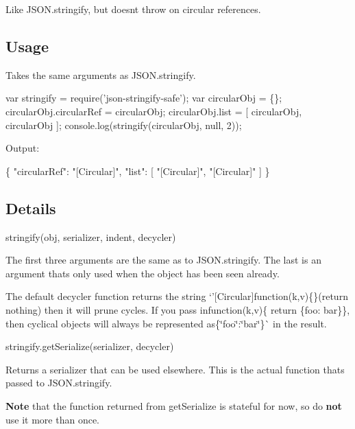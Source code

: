 Like J\+S\+O\+N.\+stringify, but doesn\textquotesingle{}t throw on circular references.

\subsection*{Usage}

Takes the same arguments as {\ttfamily J\+S\+O\+N.\+stringify}.


\begin{DoxyCode}
var stringify = require('json-stringify-safe');
var circularObj = \{\};
circularObj.circularRef = circularObj;
circularObj.list = [ circularObj, circularObj ];
console.log(stringify(circularObj, null, 2));
\end{DoxyCode}


Output\+:


\begin{DoxyCode}
\{
  "circularRef": "[Circular]",
  "list": [
    "[Circular]",
    "[Circular]"
  ]
\}
\end{DoxyCode}


\subsection*{Details}


\begin{DoxyCode}
stringify(obj, serializer, indent, decycler)
\end{DoxyCode}


The first three arguments are the same as to J\+S\+O\+N.\+stringify. The last is an argument that\textquotesingle{}s only used when the object has been seen already.

The default {\ttfamily decycler} function returns the string `'\mbox{[}Circular\mbox{]}function(k,v)\{\}{\ttfamily (return nothing) then it will prune cycles. If you pass in}function(k,v)\{ return \{foo\+: \textquotesingle{}bar\textquotesingle{}\}\}{\ttfamily , then cyclical objects will always be represented as}\{\char`\"{}foo\char`\"{}\+:\char`\"{}bar\char`\"{}\}\`{} in the result.


\begin{DoxyCode}
stringify.getSerialize(serializer, decycler)
\end{DoxyCode}


Returns a serializer that can be used elsewhere. This is the actual function that\textquotesingle{}s passed to J\+S\+O\+N.\+stringify.

{\bfseries Note} that the function returned from {\ttfamily get\+Serialize} is stateful for now, so do {\bfseries not} use it more than once. 